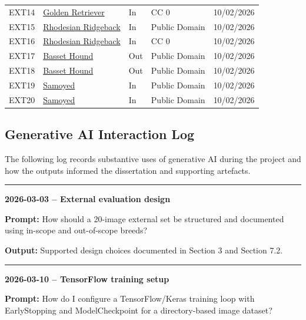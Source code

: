 \documentclass[12pt, a4paper]{article}
\begin{document}
\begin{longtable}{@{}
p{1.4cm}
>{\raggedright\arraybackslash}p{4.2cm}
p{1cm}
p{2.2cm}
p{1.8cm}
@{}}
  EXT14 & \href{https://commons.wikimedia.org/wiki/File:Golden_Retriever_Dukedestiny01_drvd.jpg}{Golden Retriever} & In & CC 0 & 10/02/2026 \\
  EXT15 & \href{https://commons.wikimedia.org/wiki/File:Gala.jpg}{Rhodesian Ridgeback} & In & Public Domain & 10/02/2026 \\
  EXT16 & \href{https://commons.wikimedia.org/wiki/File:Rhodesian_Ridgeback_Livernose_female.jpg}{Rhodesian Ridgeback} & In & CC 0 & 10/02/2026 \\
  EXT17 & \href{https://commons.wikimedia.org/wiki/File:Basset_hound_2ans.jpeg}{Basset Hound} & Out & Public Domain & 10/02/2026 \\
  EXT18 & \href{https://commons.wikimedia.org/wiki/File:Male_basset_hound.jpg}{Basset Hound} & Out & Public Domain & 10/02/2026 \\
  EXT19 & \href{https://commons.wikimedia.org/wiki/File:Samoyed_on_Beach.jpg}{Samoyed} & In & Public Domain & 10/02/2026 \\
  EXT20 & \href{https://commons.wikimedia.org/wiki/File:Samoieda_03.JPG}{Samoyed} & In & Public Domain & 10/02/2026 \\

\end{longtable}

\subsection{Generative AI Interaction Log}

The following log records substantive uses of generative AI during the project and how the outputs informed the dissertation and supporting artefacts.

\noindent\rule{\textwidth}{0.4pt}

\textbf{2026-03-03 -- External evaluation design}

\textbf{Prompt:} How should a 20-image external set be structured and documented using in-scope and out-of-scope breeds?

\textbf{Output:} Supported design choices documented in Section 3 and Section 7.2.

\vspace{0.4cm}
\noindent\rule{\textwidth}{0.4pt}

\textbf{2026-03-10 -- TensorFlow training setup}

\textbf{Prompt:} How do I configure a TensorFlow/Keras training loop with EarlyStopping and ModelCheckpoint for a directory-based image dataset?
\end{document}
